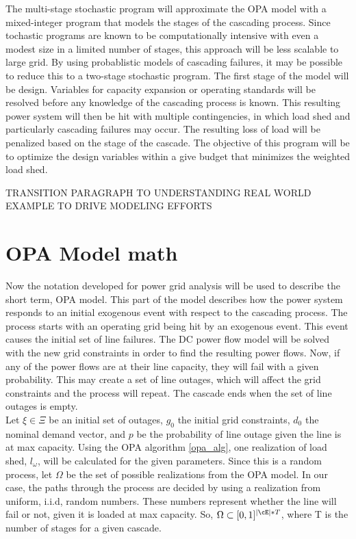 The multi-stage stochastic program will approximate the OPA model with a mixed-integer program that models the stages of the cascading process.  Since tochastic programs are known to be computationally intensive with even a modest size in a limited number of stages, this approach will be less scalable to large grid.  By using probablistic models of cascading failures, \cite{Dobson_2005} it may be possible to reduce this to a two-stage stochastic program.  The first stage of the model will be design.  Variables for capacity expansion or operating standards will be resolved before any knowledge of the cascading process is known.  This resulting power system will then be hit with multiple contingencies, in which load shed and particularly cascading failures may occur.  The resulting loss of load will be penalized based on the stage of the cascade.  The objective of this program will be to optimize the design variables within a give budget that minimizes the weighted load shed.  

TRANSITION PARAGRAPH TO UNDERSTANDING REAL WORLD EXAMPLE TO DRIVE MODELING EFFORTS





\section{OPA Model math}

Now the notation developed for power grid analysis will be used to describe the short term, OPA model.  This part of the model describes how the power system responds to an initial exogenous event with respect to the cascading process.  The process starts with an operating grid being hit by an exogenous event.  This event causes the initial set of line failures.  The DC power flow model will be solved with the new grid constraints in order to find the resulting power flows.  Now, if any of the power flows are at their line capacity, they will fail with a given probability.  This may create a set of line outages, which will affect the grid constraints and the process will repeat.  The cascade ends when the set of line outages is empty. \\

Let $\xi \in \Xi$ be an initial set of outages, $g_0$ the initial grid constraints, $d_0$ the nominal demand vector,  and $p$ be the probability of line outage given the line is at max capacity.  Using the OPA algorithm \ref{opa_alg}, one realization of load shed, $l_\omega$, will be calculated for the given parameters.  Since this is a random process, let $\Omega$ be the set of possible realizations from the OPA model.  In our case, the paths through the process are decided by using a realization from uniform, i.i.d, random numbers.  These numbers represent whether the line will fail or not, given it is loaded at max capacity.  So, $\Omega \subset [0,1]^{ \left| \cE \right| * T } $, where T is the number of stages for a given cascade.  

